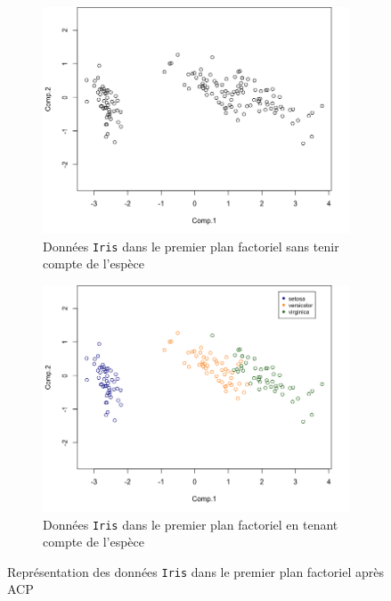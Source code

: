 \documentclass[a4paper,10pt]{report}
\begin{document}
\begin{figure}[H]
	\centering
	\captionsetup{justification=centering, margin=2cm}
	\begin{subfigure}[b]{0.5\linewidth}
		\centering
		\captionsetup{justification=centering, margin=1cm}
		\includegraphics[width=1\linewidth]{img/1-iris-acp-premier-plan-factoriel}
		\caption{\small Données \texttt{Iris} dans le premier plan factoriel sans tenir compte de l'espèce}
		\label{fig:1-iris-acp-premier-plan-factoriel}
	\end{subfigure}%
	\begin{subfigure}[b]{0.5\linewidth}
		\centering
		\captionsetup{justification=centering, margin=1cm}
		\includegraphics[width=1\linewidth]{img/1-iris-acp-premier-plan-factoriel-discr-species}
		\caption{\small Données \texttt{Iris} dans le premier plan factoriel en tenant compte de l'espèce}
		\label{fig:1-iris-acp-premier-plan-factoriel-discr-species}
	\end{subfigure}%
	\caption{\small Représentation des données \texttt{Iris} dans le premier plan factoriel après ACP}
	\label{fig:1-iris-acp-representation-graphique}%
\end{figure}
\end{document}
